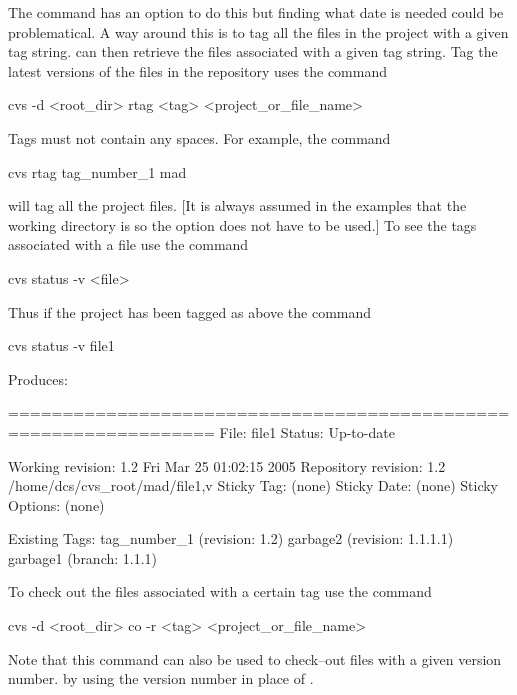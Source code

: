 The  command has an option to do this but finding what date
is needed could be problematical. A way around this is to tag all
the files in the project with a given tag string. \cvs can then
retrieve the files associated with a given tag string. Tag the
latest versions of the files in the repository uses the command
\begin{example}
  cvs -d <root_dir> rtag <tag> <project_or_file_name>
\end{example}
Tags must not contain any spaces. For example, the command
\begin{example}
  cvs rtag tag_number_1 mad
\end{example}
will tag all the  project files. [It is always assumed in the
examples that the working directory is  so the  option
does not have to be used.] To see the tags associated with a file use
the command
\begin{example}
  cvs status -v <file>
\end{example}
Thus if the  project has been tagged as above the command
\begin{example}
  cvs status -v file1
\end{example}
Produces:
\begin{example}
  =================================================================
  File: file1             Status: Up-to-date
  
     Working revision:    1.2     Fri Mar 25 01:02:15 2005             
     Repository revision: 1.2     /home/dcs/cvs_root/mad/file1,v
     Sticky Tag:          (none)
     Sticky Date:         (none)
     Sticky Options:      (none)
  
     Existing Tags:
          tag_number_1                    (revision: 1.2)
          garbage2                        (revision: 1.1.1.1)
          garbage1                        (branch: 1.1.1)
\end{example}

To check out the files associated with a certain tag use the command
\begin{example}
  cvs -d <root_dir> co -r <tag> <project_or_file_name>
\end{example}
Note that this command can also be used to check--out files with a
given version number. by using the version number in place of
.

